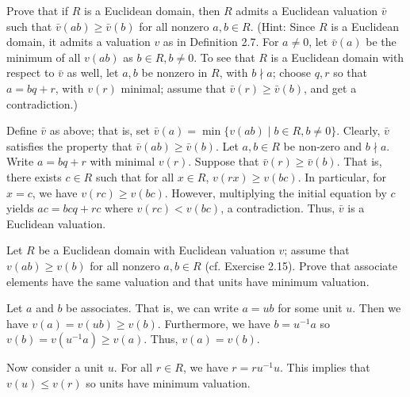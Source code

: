 \documentclass[../../master.tex]{subfiles}
\begin{document}
    \begin{problem}
        Prove that if $R$ is a Euclidean domain, then $R$ admits a Euclidean
        valuation $\bar{v}$ such that $\bar{v}(ab) \geq \bar{v}(b)$ for all
        nonzero $a, b \in R$. (Hint: Since $R$ is a Euclidean domain, it admits
        a valuation $v$ as in Definition 2.7. For $a \neq 0$, let $\bar{v}(a)$
        be the minimum of all $v(ab)$ as $b \in R, b \neq 0$. To see that $R$ is
        a Euclidean domain with respect to $\bar{v}$ as well, let $a, b$ be
        nonzero in $R$, with $b \nmid a$; choose $q, r$ so that $a = bq + r$,
        with $v(r)$ minimal; assume that $\bar{v}(r) \geq \bar{v}(b)$, and get a
        contradiction.)
    \end{problem}

    \begin{solution}
        Define $\bar{v}$ as above; that is, set $\bar{v}(a) = \min \{v(ab) \mid
        b \in R, b \neq 0 \}$. Clearly, $\bar{v}$ satisfies the property that
        $\bar{v}(ab) \geq \bar{v}(b)$. Let $a, b \in R$ be non-zero and $b \nmid
        a$.  Write $a = bq + r$ with minimal $v(r)$. Suppose that $\bar{v}(r)
        \geq \bar{v}(b)$. That is, there exists $c \in R$ such that for all $x
        \in R$, $v(rx) \geq v(bc)$. In particular, for $x = c$, we have $v(rc)
        \geq v(bc)$. However, multiplying the initial equation by $c$ yields $ac
        = bcq + rc$ where $v(rc) < v(bc)$, a contradiction. Thus, $\bar{v}$ is a
        Euclidean valuation.
    \end{solution}

    \begin{problem}
        Let $R$ be a Euclidean domain with Euclidean valuation $v$; assume that
        $v(ab) \geq v(b)$ for all nonzero $a, b \in R$ (cf. Exercise 2.15).
        Prove that associate elements have the same valuation and that units
        have minimum valuation.
    \end{problem}

    \begin{solution}
        Let $a$ and $b$ be associates. That is, we can write $a = ub$ for some
        unit $u$. Then we have $v(a) = v(ub) \geq v(b)$. Furthermore, we have $b
        = u^{-1}a$ so $v(b) = v(u^{-1}a) \geq v(a)$. Thus, $v(a) = v(b)$.

        Now consider a unit $u$. For all $r \in R$, we have $r = ru^{-1}u$.
        This implies that $v(u) \leq v(r)$ so units have minimum valuation.
    \end{solution}
\end{document}
